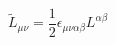 \begin{equation}
\tilde{L}_{\mu \nu} = \frac{1}{2} \epsilon_{\mu \nu \alpha \beta} L^{\alpha \beta}
\end{equation}

